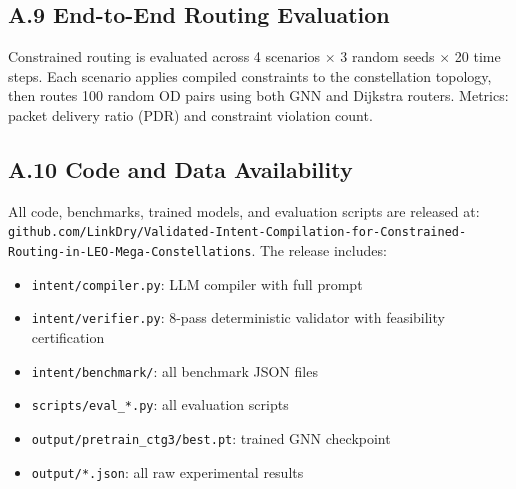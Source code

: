 \subsection*{A.9 End-to-End Routing Evaluation}

Constrained routing is evaluated across 4 scenarios $\times$ 3 random
seeds $\times$ 20 time steps. Each scenario applies compiled constraints
to the constellation topology, then routes 100 random OD pairs using
both GNN and Dijkstra routers. Metrics: packet delivery ratio (PDR)
and constraint violation count.

\subsection*{A.10 Code and Data Availability}

All code, benchmarks, trained models, and evaluation scripts are
released at: \texttt{github.com/LinkDry/Validated-Intent-Compilation-for-Constrained-Routing-in-LEO-Mega-Constellations}. The release includes:
\begin{itemize}
\item \texttt{intent/compiler.py}: LLM compiler with full prompt
\item \texttt{intent/verifier.py}: 8-pass deterministic validator with feasibility certification
\item \texttt{intent/benchmark/}: all benchmark JSON files
\item \texttt{scripts/eval\_*.py}: all evaluation scripts
\item \texttt{output/pretrain\_ctg3/best.pt}: trained GNN checkpoint
\item \texttt{output/*.json}: all raw experimental results
\end{itemize}
